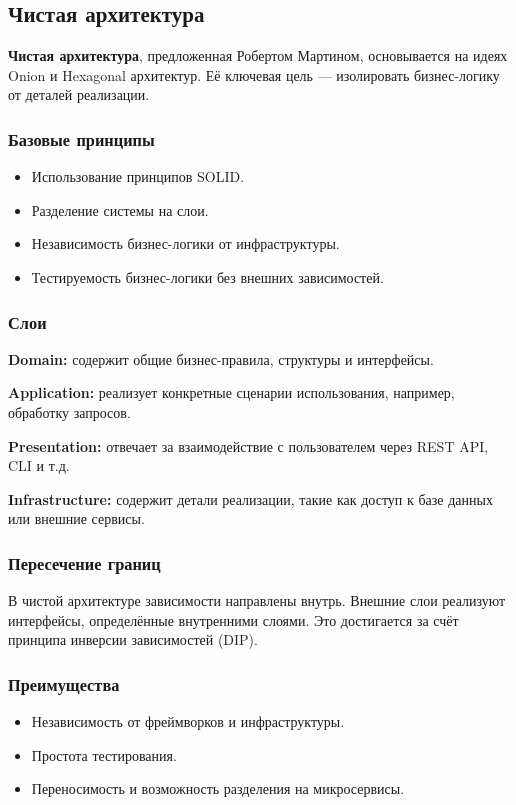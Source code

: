 \subsection{Чистая архитектура}
\textbf{Чистая архитектура}, предложенная Робертом Мартином, основывается на идеях Onion и Hexagonal архитектур. Её ключевая цель — изолировать бизнес-логику от деталей реализации.

\subsubsection{Базовые принципы}
\begin{itemize}
    \item Использование принципов SOLID.
    \item Разделение системы на слои.
    \item Независимость бизнес-логики от инфраструктуры.
    \item Тестируемость бизнес-логики без внешних зависимостей.
\end{itemize}

\subsubsection{Слои}
\textbf{Domain:} содержит общие бизнес-правила, структуры и интерфейсы.

\textbf{Application:} реализует конкретные сценарии использования, например, обработку запросов.

\textbf{Presentation:} отвечает за взаимодействие с пользователем через REST API, CLI и т.д.

\textbf{Infrastructure:} содержит детали реализации, такие как доступ к базе данных или внешние сервисы.

\subsubsection{Пересечение границ}
В чистой архитектуре зависимости направлены внутрь. Внешние слои реализуют интерфейсы, определённые внутренними слоями. Это достигается за счёт принципа инверсии зависимостей (DIP).

\subsubsection{Преимущества}
\begin{itemize}
    \item Независимость от фреймворков и инфраструктуры.
    \item Простота тестирования.
    \item Переносимость и возможность разделения на микросервисы.
\end{itemize}

